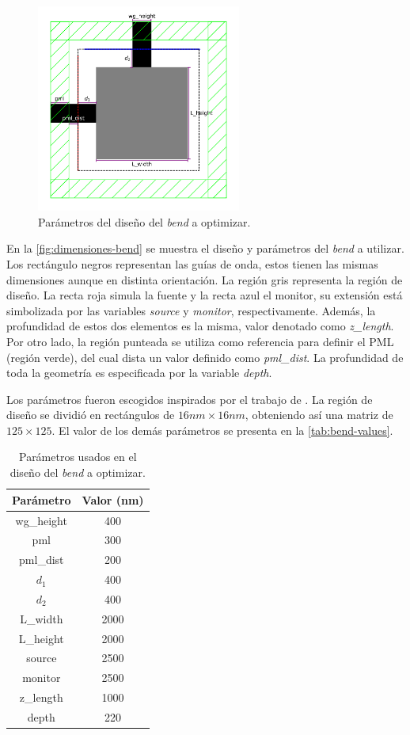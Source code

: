 \begin{figure}[ht]
  \centering
  \includegraphics[width=0.6\textwidth]{image/proposal/bend.png}
  \caption{Parámetros del diseño del \emph{bend} a optimizar.}
  \label{fig:dimensiones-bend}
\end{figure}

En la \autoref{fig:dimensiones-bend} se muestra el diseño y parámetros del \emph{bend} a utilizar.
Los rectángulo negros representan las guías de onda, estos tienen las mismas dimensiones aunque en distinta orientación.
La región gris representa la región de diseño.
La recta roja simula la fuente y la recta azul el monitor, su extensión está
simbolizada por las variables \emph{source} y \emph{monitor}, respectivamente.
Además, la profundidad de estos dos elementos es la misma, valor denotado como \emph{z\_length}.
Por otro lado, la región punteada se utiliza como referencia para definir el PML (región verde),
del cual dista un valor definido como \emph{pml\_dist}. 
La profundidad de toda la geometría es especificada por la variable \emph{depth}.

Los parámetros fueron escogidos inspirados por el trabajo de \cite{Su2020}.
La región de diseño se dividió en rectángulos de $16nm \times 16 nm$, obteniendo así una
matriz de $125 \times 125$.
El valor de los demás parámetros se presenta en la \autoref{tab:bend-values}.

\begin{table}[ht]
    \centering
    \begin{tabular}{|c|c|}
    \hline 
    Parámetro &  Valor (nm) \\
    \hline 
    wg\_height & 400 \\
    pml & 300 \\
    pml\_dist & 200 \\
    $d_1$ & 400 \\
    $d_2$ & 400 \\
    L\_width & 2000 \\
    L\_height & 2000 \\
    source & 2500 \\
    monitor & 2500 \\
    z\_length & 1000 \\
    depth & 220 \\
    \hline 
    \end{tabular}
    \caption{Parámetros usados en el diseño del \emph{bend} a optimizar.}
    \label{tab:bend-values}
\end{table}

